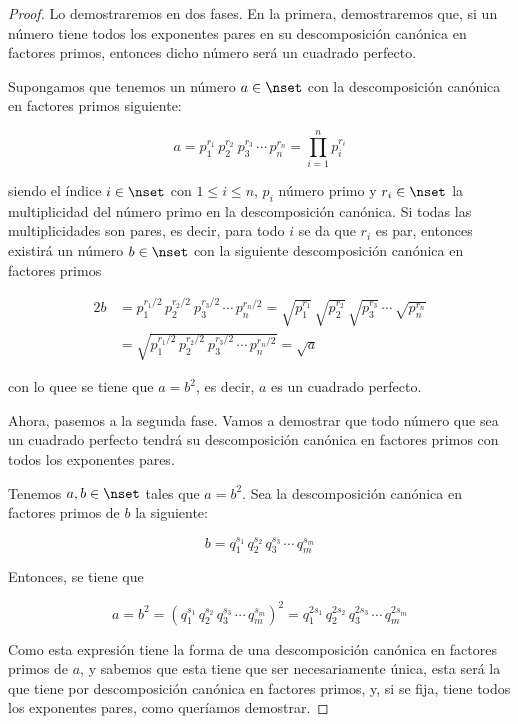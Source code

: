 \begin{proof}
  Lo demostraremos en dos fases. En la primera, demostraremos que, si un
  número tiene todos los exponentes pares en su descomposición canónica en
  factores primos, entonces dicho número será un cuadrado perfecto.

  Supongamos que tenemos un número $a \in \nset$ con la descomposición
  canónica en factores primos siguiente:

  $$ a = p_1^{r_1} \, p_2^{r_2} \ p_3^{r_3} \, \cdots \, p_n^{r_n}
  = \prod_{i=1}^n p_i^{r_i} $$

  \noindent siendo el índice $i \in \nset$ con $1 \leq i \leq n$, $p_i$
  número primo y $r_i \in \nset$ la multiplicidad del número primo en la
  descomposición canónica. Si todas las multiplicidades son pares, es decir,
  para todo $i$ se da que $r_i$ es par, entonces existirá un número $b \in
  \nset$ con la siguiente descomposición canónica en factores primos

  \begin{alignat*}{2}
    b &= p_1^{r_1/2} \, p_2^{r_2/2} \ p_3^{r_3/2} \, \cdots \, p_n^{r_n/2} =
        \sqrt{p_1^{r_1}} \, \sqrt{p_2^{r_2}} \, \sqrt{p_3^{r_3}} \, \cdots
        \, \sqrt{p_n^{r_n}} \\
      &= \sqrt{p_1^{r_1/2} \, p_2^{r_2/2} \ p_3^{r_3/2} \, \cdots \,
        p_n^{r_n/2}} = \sqrt{a}
  \end{alignat*}

  \noindent con lo quee se tiene que $a = b^2$, es decir, $a$ es un cuadrado
  perfecto.

  Ahora, pasemos a la segunda fase. Vamos a demostrar que todo número que
  sea un cuadrado perfecto tendrá su descomposición canónica en factores
  primos con todos los exponentes pares.

  Tenemos $a, b \in \nset$ tales que $a = b^2$. Sea la descomposición
  canónica en factores primos de $b$ la siguiente:

  $$ b = q_1^{s_1} \, q_2^{s_2} \, q_3^{s_3} \, \cdots \, q_m^{s_m} $$

  \noindent Entonces, se tiene que

  $$ a = b^2 = \left( q_1^{s_1} \, q_2^{s_2} \, q_3^{s_3} \, \cdots \,
  q_m^{s_m} \right)^2 = q_1^{2s_1} \, q_2^{2s_2} \, q_3^{2s_3} \, \cdots \,
  q_m^{2s_m} $$

  \noindent Como esta expresión tiene la forma de una descomposición
  canónica en factores primos de $a$, y sabemos que esta tiene que ser
  necesariamente única, esta será la que tiene por descomposición canónica
  en factores primos, y, si se fija, tiene todos los exponentes pares, como
  queríamos demostrar.
\end{proof}

